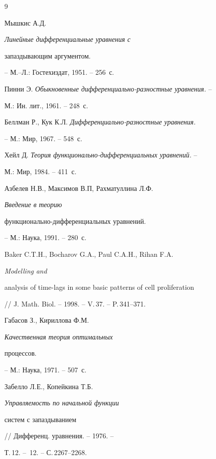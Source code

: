 \begin{thebibliography}{9}





\bibitem{}


Мышкис А.Д. {\em Линейные дифференциальные уравнения с 


запаздывающим аргументом.} -- М.--Л.: Гостехиздат, 1951. -- 256~с.




Пинни Э. {\em Обыкновенные дифференциально-разностные уравнения.} -- 


М.: Ин. лит., 1961. -- 248~с.




Беллман Р., Кук К.Л. {\em Дифференциально-разностные уравнения.} 


-- М.: Мир, 1967. -- 548~с.




Хейл Д. {\em Теория функционально-дифференциальных уравнений.} -- 


М.: Мир, 1984. -- 411~с.




Азбелев Н.В., Максимов В.П, Рахматуллина Л.Ф. {\em Введение в теорию


функционально-дифференциальных уравнений.} -- М.: Наука, 1991. -- 280~с.




Baker C.T.H., Bocharov G.A., Paul C.A.H., Rihan F.A. {\em Modelling and


analysis of time-lags in some basic patterns of cell proliferation}


// J. Math. Biol. -- 1998. -- V.\,37. -- P.\,341--371.




Габасов З., Кириллова Ф.М. {\em Качественная теория оптимальных 


процессов.} -- М.: Наука, 1971. -- 507~с. 




Забелло Л.Е., Копейкина Т.Б. {\em Управляемость по начальной функции


систем с запаздыванием} // Дифференц. уравнения. -- 1976. -- 


Т.\,12. -- \No\,12. -- С.\,2267--2268. 





\end{thebibliography}





\vskip 2cm











\post{\it }{}





\label{end}





